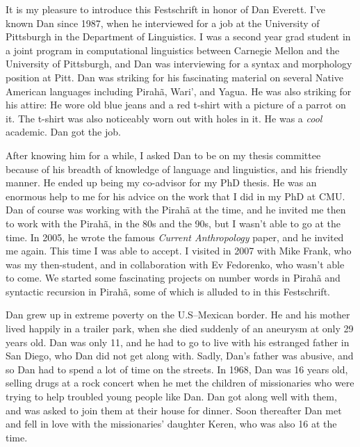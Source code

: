 \begin{refsection}

It is my pleasure to introduce this Festschrift in honor of Dan Everett. I've known Dan since 1987, when he interviewed for a job at the University of Pittsburgh in the Department of Linguistics. I was a second year grad student in a joint program in computational linguistics between Carnegie Mellon and the University of Pittsburgh, and Dan was interviewing for a syntax and morphology position at Pitt. Dan was striking for his fascinating material on several Native American languages including Pirahã, Wari', and Yagua. He was also striking for his attire: He wore old blue jeans and a red t-shirt with a picture of a parrot on it.  The t-shirt was also noticeably worn out with holes in it. He was a \textit{cool} academic. Dan got the job. 

After knowing him for a while, I asked Dan to be on my thesis committee because of his breadth of knowledge of language and linguistics, and his friendly manner. He ended up being my co-advisor for my PhD thesis. He was an enormous help to me for his advice on the work that I did in my PhD at CMU. Dan of course was working with the Pirahã at the time, and he invited me then to work with the Pirahã, in the 80s and the 90s, but I wasn't able to go at the time. In 2005, he wrote the famous \textit{Current Anthropology} paper, and he invited me again. This time I was able to accept. I visited in 2007 with Mike Frank, who was my then-student, and in collaboration with Ev Fedorenko, who wasn't able to come. We started some fascinating projects on number words in Pirahã and syntactic recursion in Pirahã, some of which is alluded to in this Festschrift. 

\begin{sloppypar}
Dan grew up in extreme poverty on the U.S–Mexican border. He and his mother lived happily in a trailer park, when she died suddenly of an aneurysm at only 29 years old. Dan was only 11, and he had to go to live with his estranged father in San Diego, who Dan did not get along with. Sadly, Dan's father was abusive, and so Dan had to spend a lot of time on the streets. In 1968, Dan was 16 years old, selling drugs at a rock concert when he met the children of missionaries who were trying to help troubled young people like Dan. Dan got along well with them, and was asked to join them at their house for dinner. Soon thereafter Dan met and fell in love with the missionaries' daughter Keren, who was also 16 at the time.
\end{sloppypar}


\end{refsection}

